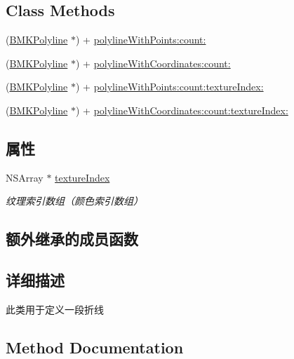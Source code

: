 \subsection*{Class Methods}
\begin{DoxyCompactItemize}
\item 
(\hyperlink{interface_b_m_k_polyline}{B\+M\+K\+Polyline} $\ast$) + \hyperlink{interface_b_m_k_polyline_aa4f399b9bcc1c33b871b3d8152842eac}{polyline\+With\+Points\+:count\+:}
\item 
(\hyperlink{interface_b_m_k_polyline}{B\+M\+K\+Polyline} $\ast$) + \hyperlink{interface_b_m_k_polyline_af43f8ff39d6a8c56f28f3294f9c41681}{polyline\+With\+Coordinates\+:count\+:}
\item 
(\hyperlink{interface_b_m_k_polyline}{B\+M\+K\+Polyline} $\ast$) + \hyperlink{interface_b_m_k_polyline_a88f1ef401c4da757e8755290fee9eb8d}{polyline\+With\+Points\+:count\+:texture\+Index\+:}
\item 
(\hyperlink{interface_b_m_k_polyline}{B\+M\+K\+Polyline} $\ast$) + \hyperlink{interface_b_m_k_polyline_a37305d1bcdfa974f6a27ee7c851346b7}{polyline\+With\+Coordinates\+:count\+:texture\+Index\+:}
\end{DoxyCompactItemize}
\subsection*{属性}
\begin{DoxyCompactItemize}
\item 
\hypertarget{interface_b_m_k_polyline_aec0935d96a69970dbf9780f8e35c7702}{}N\+S\+Array $\ast$ \hyperlink{interface_b_m_k_polyline_aec0935d96a69970dbf9780f8e35c7702}{texture\+Index}\label{interface_b_m_k_polyline_aec0935d96a69970dbf9780f8e35c7702}

\begin{DoxyCompactList}\small\item\em 纹理索引数组（颜色索引数组） \end{DoxyCompactList}\end{DoxyCompactItemize}
\subsection*{额外继承的成员函数}


\subsection{详细描述}
此类用于定义一段折线 

\subsection{Method Documentation}
\hypertarget{interface_b_m_k_polyline_af43f8ff39d6a8c56f28f3294f9c41681}{}
